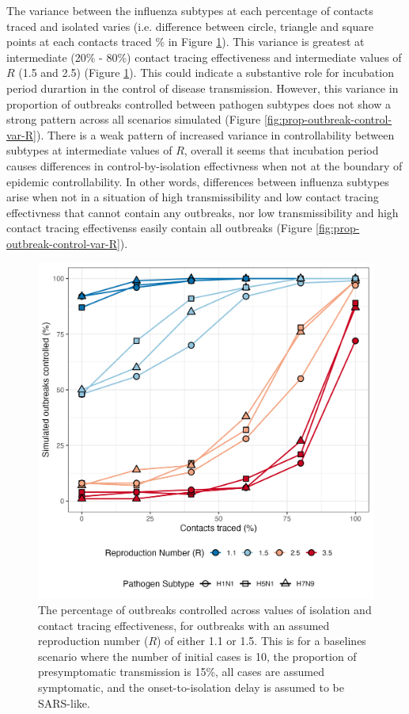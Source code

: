 \documentclass{article}
\begin{document}
The variance between the influenza subtypes at each percentage of contacts traced and isolated varies (i.e. difference between circle, triangle and square points at each contacts traced \% in Figure \ref{fig:prop-outbreak-control-R}). This variance is greatest at intermediate (20\% - 80\%) contact tracing effectiveness and intermediate values of $R$ (1.5 and 2.5) (Figure \ref{fig:prop-outbreak-control-R}). This could indicate a substantive role for incubation period durartion in the control of disease transmission. However, this variance in proportion of outbreaks controlled between pathogen subtypes does not show a strong pattern across all scenarios simulated (Figure \ref{fig:prop-outbreak-control-var-R}). There is a weak pattern of increased variance in controllability between subtypes at intermediate values of $R$, overall it seems that incubation period causes differences in control-by-isolation effectivness when not at the boundary of epidemic controllability. In other words, differences between influenza subtypes arise when not in a situation of high transmissibility and low contact tracing effectivness that cannot contain any outbreaks, nor low transmissibility and high contact tracing effectivenss easily contain all outbreaks (Figure \ref{fig:prop-outbreak-control-var-R}). \\

\begin{figure}[ht]
\centering
\includegraphics[width=\textwidth]{../plots/prop_outbreak_control_reproduction_number.png}
\caption{The percentage of outbreaks controlled across values of isolation and contact tracing effectiveness, for outbreaks with an assumed reproduction number ($R$) of either 1.1 or 1.5. This is for a baselines scenario where the number of initial cases is 10, the proportion of presymptomatic transmission is 15\%, all cases are assumed symptomatic, and the onset-to-isolation delay is assumed to be SARS-like.}
\label{fig:prop-outbreak-control-R}
\end{figure}
\end{document}
